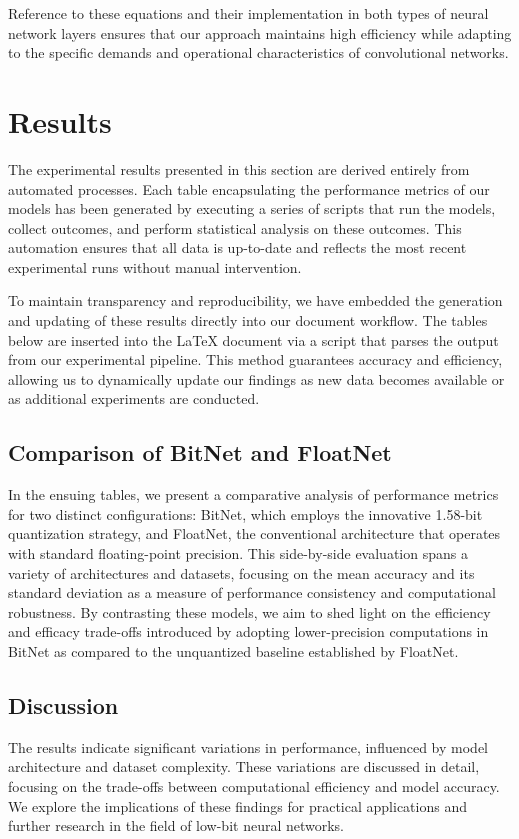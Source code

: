 \documentclass{article}
\begin{document}
Reference to these equations and their implementation in both types of neural network layers ensures that our approach maintains high efficiency while adapting to the specific demands and operational characteristics of convolutional networks.


\section{Results}

The experimental results presented in this section are derived entirely from automated processes. Each table encapsulating the performance metrics of our models has been generated by executing a series of scripts that run the models, collect outcomes, and perform statistical analysis on these outcomes. This automation ensures that all data is up-to-date and reflects the most recent experimental runs without manual intervention.

To maintain transparency and reproducibility, we have embedded the generation and updating of these results directly into our document workflow. The tables below are inserted into the LaTeX document via a script that parses the output from our experimental pipeline. This method guarantees accuracy and efficiency, allowing us to dynamically update our findings as new data becomes available or as additional experiments are conducted.

\subsection{Comparison of BitNet and FloatNet}

In the ensuing tables, we present a comparative analysis of performance metrics for two distinct configurations: BitNet, which employs the innovative 1.58-bit quantization strategy, and FloatNet, the conventional architecture that operates with standard floating-point precision. This side-by-side evaluation spans a variety of architectures and datasets, focusing on the mean accuracy and its standard deviation as a measure of performance consistency and computational robustness. By contrasting these models, we aim to shed light on the efficiency and efficacy trade-offs introduced by adopting lower-precision computations in BitNet as compared to the unquantized baseline established by FloatNet.




\subsection{Discussion}

The results indicate significant variations in performance, influenced by model architecture and dataset complexity. These variations are discussed in detail, focusing on the trade-offs between computational efficiency and model accuracy. We explore the implications of these findings for practical applications and further research in the field of low-bit neural networks.


\clearpage


\end{document}
